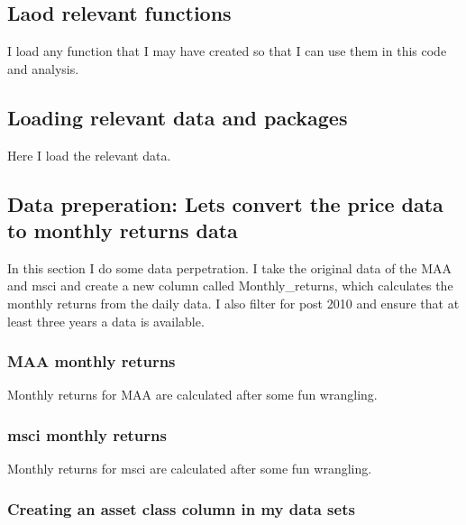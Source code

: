 \documentclass[11pt,preprint, authoryear]{elsarticle}
\numberwithin{equation}{section}
\numberwithin{figure}{section}
\numberwithin{table}{section}
\begin{document}
\hypertarget{laod-relevant-functions}{%
\subsection{Laod relevant functions}\label{laod-relevant-functions}}

I load any function that I may have created so that I can use them in
this code and analysis.

\hypertarget{loading-relevant-data-and-packages}{%
\subsection{Loading relevant data and
packages}\label{loading-relevant-data-and-packages}}

Here I load the relevant data.

\hypertarget{data-preperation-lets-convert-the-price-data-to-monthly-returns-data}{%
\subsection{Data preperation: Lets convert the price data to monthly
returns
data}\label{data-preperation-lets-convert-the-price-data-to-monthly-returns-data}}

In this section I do some data perpetration. I take the original data of
the MAA and msci and create a new column called Monthly\_returns, which
calculates the monthly returns from the daily data. I also filter for
post 2010 and ensure that at least three years a data is available.

\hypertarget{maa-monthly-returns}{%
\subsubsection{MAA monthly returns}\label{maa-monthly-returns}}

Monthly returns for MAA are calculated after some fun wrangling.

\hypertarget{msci-monthly-returns}{%
\subsubsection{msci monthly returns}\label{msci-monthly-returns}}

Monthly returns for msci are calculated after some fun wrangling.

\hypertarget{creating-an-asset-class-column-in-my-data-sets}{%
\subsubsection{Creating an asset class column in my data
sets}\label{creating-an-asset-class-column-in-my-data-sets}}
\end{document}
